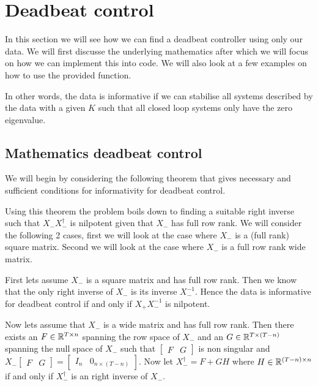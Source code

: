 \section{Deadbeat control}
In this section we will see how we can find a deadbeat controller using only our data. We will first discusse the underlying mathematics after which we will focus on how we can implement this into code. We will also look at a few examples on how to use the provided function.


In other words, the data is informative if we can stabilise all systems described by the data with a given $K$ such that all closed loop systems only have the zero eigenvalue.

\subsection{Mathematics deadbeat control}
We will begin by considering the following theorem that gives necessary and sufficient conditions for informativity for deadbeat control.


Using this theorem the problem boils down to finding a suitable right inverse such that $X_- X_-^\dagger$ is nilpotent given that $X_-$ has full row rank. We will consider the following 2 cases, first we will look at the case where $X_-$ is a (full rank) square matrix. Second we will look at the case where $X_-$ is a full row rank wide matrix.
 
First lets assume $X_-$ is a square matrix and has full row rank. Then we know that the only right inverse of $X_-$ is its inverse $X_-^{-1}$. Hence the data is informative for deadbeat control if and only if $X_+ X_-^{-1}$ is nilpotent. 

Now lets assume that $X_-$ is a wide matrix and has full row rank. Then there exists an $F \in \mathbb{R}^{T \times n}$ spanning the row space of $X_-$ and an $G \in \mathbb{R}^{T \times (T-n)}$ spanning the null space of $X_-$ such that $\begin{bmatrix}F&G\end{bmatrix}$ is non singular and $X_- \begin{bmatrix}F&G\end{bmatrix} = \begin{bmatrix}I_n&0_{n\times (T-n)}\end{bmatrix}$. Now let $X^\dagger_- = F + G H$ where $H \in \mathbb{R}^{(T-n) \times n}$ if and only if $X_-^\dagger$ is an right inverse of $X_-$.

